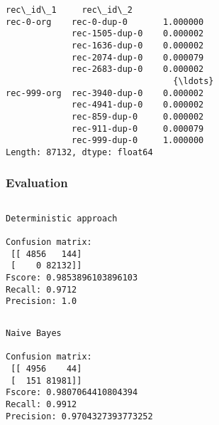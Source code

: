 \documentclass{article}
\begin{document}
    \begin{Verbatim}[commandchars=\\\{\}]
rec\_id\_1     rec\_id\_2      
rec-0-org    rec-0-dup-0       1.000000
             rec-1505-dup-0    0.000002
             rec-1636-dup-0    0.000002
             rec-2074-dup-0    0.000079
             rec-2683-dup-0    0.000002
                                 {\ldots}   
rec-999-org  rec-3940-dup-0    0.000002
             rec-4941-dup-0    0.000002
             rec-859-dup-0     0.000002
             rec-911-dup-0     0.000079
             rec-999-dup-0     1.000000
Length: 87132, dtype: float64

    \end{Verbatim}

    \hypertarget{evaluation}{%
\subsubsection{Evaluation}\label{evaluation}}

    \begin{Verbatim}[commandchars=\\\{\}]

\end{Verbatim}

    \begin{Verbatim}[commandchars=\\\{\}]
Deterministic approach 

Confusion matrix: 
 [[ 4856   144]
 [    0 82132]]
Fscore: 0.9853896103896103
Recall: 0.9712
Precision: 1.0

    \end{Verbatim}

    \begin{Verbatim}[commandchars=\\\{\}]

\end{Verbatim}

    \begin{Verbatim}[commandchars=\\\{\}]
Naive Bayes 

Confusion matrix: 
 [[ 4956    44]
 [  151 81981]]
Fscore: 0.9807064410804394
Recall: 0.9912
Precision: 0.9704327393773252

    \end{Verbatim}

    \begin{Verbatim}[commandchars=\\\{\}]

\end{Verbatim}
\end{document}
